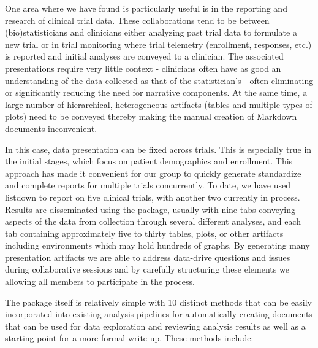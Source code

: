 \documentclass[
]{jss}
\begin{document}
One area where we have found  is particularly useful is in
the reporting and research of clinical trial data. These collaborations
tend to be between (bio)statisticians and clinicians either analyzing
past trial data to formulate a new trial or in trial monitoring where
trial telemetry (enrollment, responses, etc.) is reported and initial
analyses are conveyed to a clinician. The associated presentations
require very little context - clinicians often have as good an
understanding of the data collected as that of the statistician's -
often eliminating or significantly reducing the need for narrative
components. At the same time, a large number of hierarchical,
heterogeneous artifacts (tables and multiple types of plots) need to be
conveyed thereby making the manual creation of  Markdown
documents inconvenient.

In this case, data presentation can be fixed across trials. This is
especially true in the initial stages, which focus on patient
demographics and enrollment. This approach has made it convenient for
our group to quickly generate standardize and complete reports for
multiple trials concurrently. To date, we have used listdown to report
on five clinical trials, with another two currently in process. Results
are disseminated using the  package, usually with nine
tabs conveying aspects of the data from collection through several
different analyses, and each tab containing approximately five to thirty
tables, plots, or other artifacts including 
\citep{trelliscopejs} environments which may hold hundreds of graphs. By
generating many presentation artifacts we are able to address data-drive
questions and issues during collaborative sessions and by carefully
structuring these elements we allowing all members to participate in the
process.

The  package itself is relatively simple with 10 distinct
methods that can be easily incorporated into existing analysis pipelines
for automatically creating documents that can be used for data
exploration and reviewing analysis results as well as a starting point
for a more formal write up. These methods include:
\end{document}
